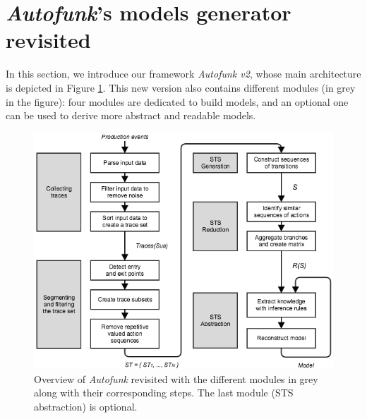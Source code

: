 
\section{\textit{Autofunk}'s models generator revisited}
\label{sec:modelinf:prodsystems:autofunk}

In this section, we introduce our framework \textit{Autofunk v2},
whose main architecture is depicted in Figure
\ref{fig:prodsystems:autofunk-overview}. This new version also
contains different modules (in grey in the figure): four modules
are dedicated to build models, and an optional one can be used to
derive more abstract and readable models.

\begin{figure}[ht]
    \begin{center}
        \includegraphics[width=1.0\linewidth]{figures/autofunk.png}
    \end{center}

    \caption{Overview of \textit{Autofunk} revisited with the different
    modules in grey along with their corresponding steps. The last
    module (STS abstraction) is optional.}
    \label{fig:prodsystems:autofunk-overview}
\end{figure}

